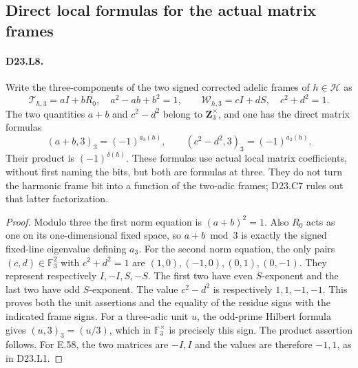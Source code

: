 \subsection{Direct local formulas for the actual matrix frames}
\paragraph{D23.L8.}
Write the three-components of the two signed corrected adelic
frames of $h\in\mathcal H$ as
\[
 \mathcal T_{h,3}=aI+bR_0,\quad a^2-ab+b^2=1,
 \qquad
 \mathcal W_{h,3}=cI+dS,\quad c^2+d^2=1.
\]
The two quantities $a+b$ and $c^2-d^2$ belong to
$\mathbf Z_3^\times$, and one has the direct matrix formulas
\[
 (a+b,3)_3=(-1)^{a_3(h)},\qquad
 (c^2-d^2,3)_3=(-1)^{a_2(h)}.
\tag{D23.L8.1}
\]
Their product is $(-1)^{\delta(h)}$.  These formulas use
actual local matrix coefficients, without first naming the bits,
but both are formulas at three.  They do not turn the harmonic
frame bit into a function of the two-adic frames; D23.C7 rules
out that latter factorization.
\begin{proof}
Modulo three the first norm equation is $(a+b)^2=1$.
Also $R_0$ acts as one on its one-dimensional fixed space,
so $a+b\bmod3$ is exactly the signed fixed-line eigenvalue
defining $a_3$.  For the second norm equation, the only pairs
$(c,d)\in\mathbb F_3^2$ with $c^2+d^2=1$ are
$(1,0),(-1,0),(0,1),(0,-1)$.  They represent respectively
$I,-I,S,-S$.  The first two have even $S$-exponent and the
last two have odd $S$-exponent.  The value $c^2-d^2$ is
respectively $1,1,-1,-1$.  This proves both the unit assertions
and the equality of the residue signs with the indicated frame
signs.  For a three-adic unit $u$, the odd-prime Hilbert formula
gives $(u,3)_3=(u/3)$, which in $\mathbb F_3^\times$ is
precisely this sign.  The product assertion follows.
For E.58, the two matrices are $-I,I$ and the values are
therefore $-1,1$, as in D23.L1.
\end{proof}
